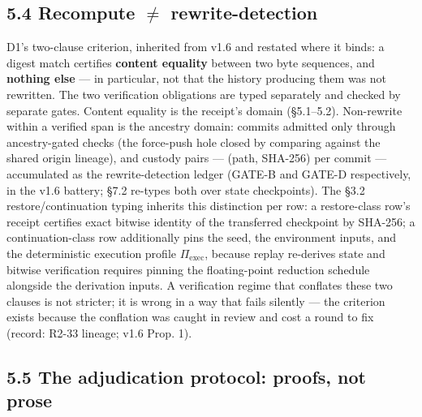 \documentclass[11pt]{article}
\begin{document}
\subsection{\texorpdfstring{5.4 Recompute \(\neq\) rewrite-detection}{5.4 Recompute \textbackslash neq rewrite-detection}}\label{recompute-neq-rewrite-detection}

D1's two-clause criterion, inherited from v1.6 and restated where it binds: a digest match certifies \textbf{content equality} between two byte sequences, and \textbf{nothing else} --- in particular, not that the history producing them was not rewritten. The two verification obligations are typed separately and checked by separate gates. Content equality is the receipt's domain (\S{}5.1--5.2). Non-rewrite within a verified span is the ancestry domain: commits admitted only through ancestry-gated checks (the force-push hole closed by comparing against the shared origin lineage), and custody pairs --- (path, SHA-256) per commit --- accumulated as the rewrite-detection ledger (GATE-B and GATE-D respectively, in the v1.6 battery; \S{}7.2 re-types both over state checkpoints). The \S{}3.2 restore/continuation typing inherits this distinction per row: a restore-class row's receipt certifies exact bitwise identity of the transferred checkpoint by SHA-256; a continuation-class row additionally pins the seed, the environment inputs, and the deterministic execution profile \(\Pi_{\text{exec}}\), because replay re-derives state and bitwise verification requires pinning the floating-point reduction schedule alongside the derivation inputs. A verification regime that conflates these two clauses is not stricter; it is wrong in a way that fails silently --- the criterion exists because the conflation was caught in review and cost a round to fix (record: R2-33 lineage; v1.6 Prop. 1).

\subsection{5.5 The adjudication protocol: proofs, not prose}\label{the-adjudication-protocol-proofs-not-prose}
\end{document}
